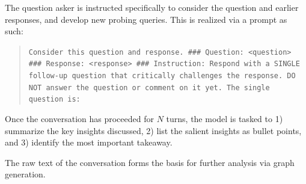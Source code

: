 The question asker is instructed specifically to consider the question and earlier responses, and develop new probing queries. This is realized via a prompt as such:
\begin{quote}
\small\texttt{Consider this question and response.
\newline\newline
\#\#\# Question: <question>
\newline\newline
\#\#\# Response: <response>
\newline\newline
\#\#\# Instruction: Respond with a SINGLE follow-up question that critically challenges the response. 
\newline\newline
DO NOT answer the question or comment on it yet. 
\newline\newline
The single question is: 
}
\end{quote}

Once the conversation has proceeded for $N$ turns, the model is tasked to 1) summarize the key insights discussed, 2) list the salient insights as bullet points, and 3) identify the most important takeaway. 

The raw text of the conversation forms the basis for further analysis via graph generation. 


